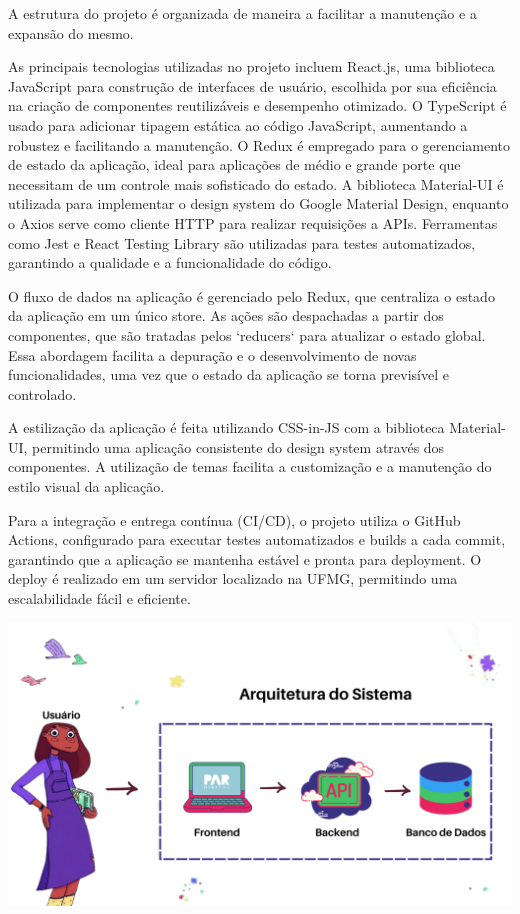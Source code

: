 \documentclass[sigconf]{webmedia}
\begin{document}
 A estrutura do projeto é organizada de maneira a facilitar 
 a manutenção e a expansão do mesmo.
 
 As principais tecnologias utilizadas no projeto incluem React.js, uma biblioteca
 JavaScript para construção de interfaces de usuário, escolhida por sua eficiência
na criação de componentes reutilizáveis e desempenho otimizado. O TypeScript é
usado para adicionar tipagem estática ao código JavaScript, aumentando a robustez
e facilitando a manutenção. O Redux é empregado para o gerenciamento de estado da
aplicação, ideal para aplicações de médio e grande porte que necessitam de um
controle mais sofisticado do estado. A biblioteca Material-UI é utilizada para
implementar o design system do Google Material Design, enquanto o Axios serve
como cliente HTTP para realizar requisições a APIs. Ferramentas como Jest e
React Testing Library são utilizadas para testes automatizados, garantindo a
qualidade e a funcionalidade do código.

O fluxo de dados na aplicação é gerenciado pelo Redux, que centraliza o estado da
aplicação em um único store. As ações são despachadas a partir dos componentes,
que são tratadas pelos `reducers` para atualizar o estado global. Essa abordagem
facilita a depuração e o desenvolvimento de novas funcionalidades, uma vez que o
estado da aplicação se torna previsível e controlado.

A estilização da aplicação é feita utilizando CSS-in-JS com a biblioteca Material-UI,
 permitindo uma aplicação consistente do design system através dos componentes.
 A utilização de temas facilita a customização e a manutenção do estilo visual da
 aplicação.

Para a integração e entrega contínua (CI/CD), o projeto utiliza
o GitHub Actions, configurado para executar testes automatizados e builds a cada
commit, garantindo que a aplicação se mantenha estável e pronta para deployment.
O deploy é realizado em um servidor localizado na UFMG, permitindo uma escalabilidade
 fácil e eficiente.
 \vspace{0.2cm}

 \includegraphics[scale=0.17]{./imgs/arquitetura.png}
\end{document}

